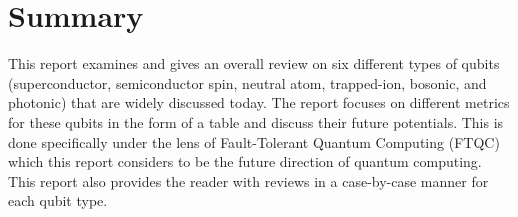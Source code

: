 \section*{Summary}
This report examines and gives an overall review on six different types of qubits (superconductor, semiconductor spin, neutral atom, trapped-ion, bosonic, and photonic) that are widely discussed today. The report focuses on different metrics for these qubits in the form of a table and discuss their future potentials. This is done specifically under the lens of Fault-Tolerant Quantum Computing (FTQC) which this report considers to be the future direction of quantum computing. This report also provides the reader with reviews in a case-by-case manner for each qubit type. 